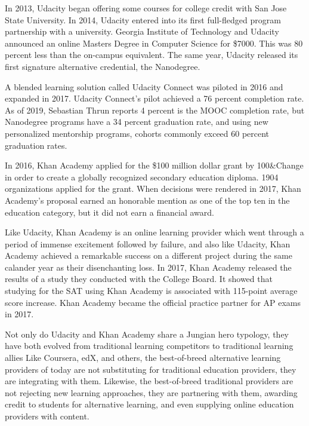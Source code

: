 \documentclass[review]{elsarticle}
\begin{document}
    In 2013, Udacity began offering some courses for college credit with San Jose State University\cite{shen_2015}.
    In 2014, Udacity entered into its first full-fledged program partnership with a university.
    Georgia Institute of Technology and Udacity announced an online Masters Degree in Computer Science for \$7000.
    This was 80 percent less than the on-campus equivalent\cite{onink2013georgia}.
    The same year, Udacity released its first signature alternative credential, the Nanodegree.

    A blended learning solution called Udacity Connect was piloted in 2016 and expanded in 2017.
    Udacity Connect's pilot achieved a 76 percent completion rate\cite{shah_2018}.
    As of 2019, Sebastian Thrun reports 4 percent is the MOOC completion rate,
    but Nanodegree programs have a 34 percent graduation rate, and using new personalized mentorship programs, cohorts commonly exceed 60 percent graduation rates.

    In 2016, Khan Academy applied for the \$100 million dollar grant by 100&Change in order to create a globally recognized secondary education diploma.
    1904 organizations applied for the grant\cite{conrad_2016}.
    When decisions were rendered in 2017, Khan Academy's proposal earned an honorable mention as one of the top ten in the education category,
    but it did not earn a financial award\cite{cushing_2017}.

    Like Udacity, Khan Academy is an online learning provider which went through a period of immense excitement followed by failure,
    and also like Udacity, Khan Academy achieved a remarkable success on a different project during the same calander year as their disenchanting loss.
    In 2017, Khan Academy released the results of a study they conducted with the College Board.
    It showed that studying for the SAT using Khan Academy is associated with 115-point average score increase\cite{khan_academy_sat_2017}.
    Khan Academy became the official practice partner for AP exams in 2017\cite{khan_academy_partner_2017}.

    Not only do Udacity and Khan Academy share a Jungian hero typology,
    they have both evolved from traditional learning competitors to traditional learning allies
    Like Coursera, edX, and others, the best-of-breed alternative learning providers of today are not substituting for traditional education providers,
    they are integrating with them. Likewise, the best-of-breed traditional providers are not rejecting new learning approaches,
    they are partnering with them, awarding credit to students for alternative learning, and even supplying online education providers with content.
\end{document}
